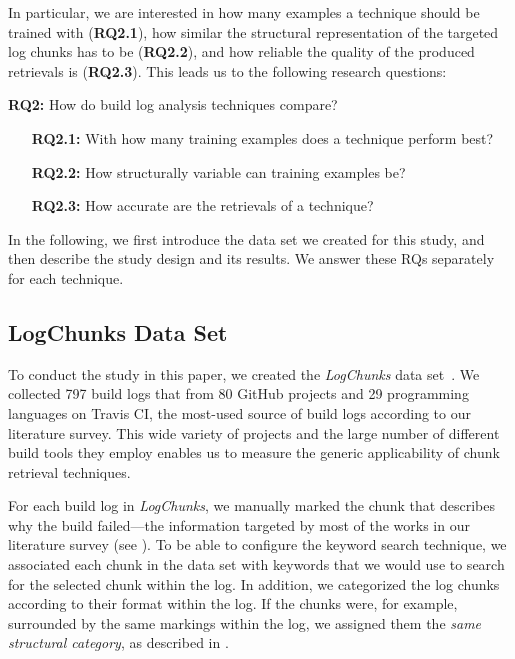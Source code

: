 In particular, we are interested in how many examples a technique
should be trained with (\textbf{RQ2.1}),
how similar the structural representation of the targeted log chunks
has to be (\textbf{RQ2.2}), and how reliable the quality of the
produced retrievals is (\textbf{RQ2.3}).
This leads us to the following research questions:

\begin{simplebox}[minipage boxed title*=-1.5cm,
attach boxed title to top center={yshift=-6mm}]
{\textbf{RQ2:} How do build log analysis techniques compare?}
\begin{itemize}[leftmargin=1.2cm]
  \item[\textbf{RQ2.1:}] With how many training examples does a
	technique perform best?
  \item[\textbf{RQ2.2:}] How structurally variable can training
  examples be?
  \item[\textbf{RQ2.3:}] How accurate are the retrievals of a technique?
\end{itemize}
\end{simplebox}

In the following, we first introduce the data set we created for this
study, and then describe the study design and its
results.
We answer these RQs separately for each technique.

\subsection{LogChunks Data Set}
\label{sec:logchunks}
To conduct the study in this paper, we created the
\emph{LogChunks} data set~\cite{brandt2020logchunks}.
We collected 797 build logs that
from 80 GitHub projects and 29
programming languages on Travis CI, the most-used source of build logs
according to our literature survey.
This wide variety of projects and the large number of different build
tools they employ enables us to measure the generic
applicability of chunk retrieval techniques.

For each build log in \emph{LogChunks}, we manually marked
the chunk that describes why the build
failed---the information targeted by most of the works in our
literature survey (see ).
To be able to configure the keyword search technique,
we associated each chunk in the data set with keywords that we
would use to search for the selected chunk within the log.
In
addition, we categorized the log chunks according to their format
within the log.
If the chunks were, for example, surrounded by the same markings
within the log, we assigned them the \emph{same structural category},
as described in .


